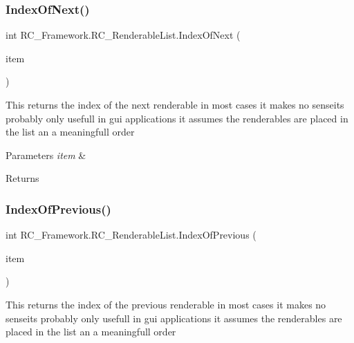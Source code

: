 \subsubsection{\texorpdfstring{Index\+Of\+Next()}{IndexOfNext()}}
{\footnotesize\ttfamily int R\+C\+\_\+\+Framework.\+R\+C\+\_\+\+Renderable\+List.\+Index\+Of\+Next (\begin{DoxyParamCaption}\item[{\mbox{\hyperlink{class_r_c___framework_1_1_r_c___renderable}{R\+C\+\_\+\+Renderable}}}]{item }\end{DoxyParamCaption})}



This returns the index of the next renderable in most cases it makes no senseits probably only usefull in gui applications it assumes the renderables are placed in the list an a meaningfull order 


\begin{DoxyParams}{Parameters}
{\em item} & \\
\hline
\end{DoxyParams}
\begin{DoxyReturn}{Returns}

\end{DoxyReturn}
\mbox{\label{class_r_c___framework_1_1_r_c___renderable_list_aa18cdc63b500d558e79c9a73ae668b30}} 
\subsubsection{\texorpdfstring{Index\+Of\+Previous()}{IndexOfPrevious()}}
{\footnotesize\ttfamily int R\+C\+\_\+\+Framework.\+R\+C\+\_\+\+Renderable\+List.\+Index\+Of\+Previous (\begin{DoxyParamCaption}\item[{\mbox{\hyperlink{class_r_c___framework_1_1_r_c___renderable}{R\+C\+\_\+\+Renderable}}}]{item }\end{DoxyParamCaption})}



This returns the index of the previous renderable in most cases it makes no senseits probably only usefull in gui applications it assumes the renderables are placed in the list an a meaningfull order 


